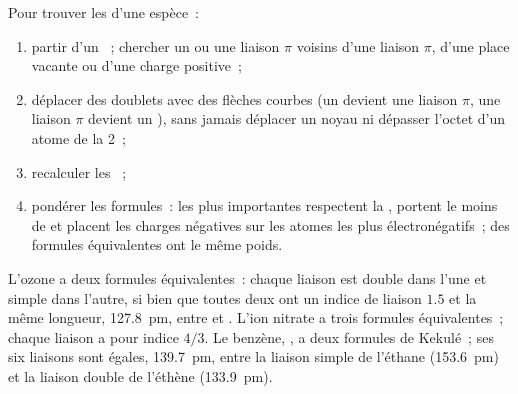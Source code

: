 \begin{method}\label{met:b1:lewis-resonance-vsepr:resonance}
Pour trouver les  d'une espèce~:
\begin{enumerate}
  \item partir d'un ~; chercher un  ou
        une liaison $\pi$ voisins d'une liaison $\pi$, d'une place vacante
        ou d'une charge positive~;
  \item déplacer des doublets avec des flèches courbes (un  devient une liaison $\pi$, une liaison $\pi$ devient un
        ), sans jamais déplacer un noyau ni dépasser
        l'octet d'un atome de la  2~;
  \item recalculer les ~;
  \item pondérer les formules~: les plus importantes respectent la , portent le moins de  et placent les
        charges négatives sur les atomes les plus électronégatifs~; des
        formules équivalentes ont le même poids.
\end{enumerate}
\end{method}

\begin{example}\label{ex:b1:lewis-resonance-vsepr:examples}
L'ozone a deux formules équivalentes~: chaque liaison  est double
dans l'une et simple dans l'autre, si bien que toutes deux ont un indice
de liaison $1.5$ et la même longueur, \qty{127.8}{pm}, entre  et
. L'ion nitrate  a trois formules équivalentes~; chaque
liaison  a pour indice $4/3$. Le benzène, , a deux
formules de Kekulé~; ses six liaisons  sont égales,
\qty{139.7}{pm}, entre la liaison simple de l'éthane (\qty{153.6}{pm})
et la liaison double de l'éthène (\qty{133.9}{pm}).
\end{example}

